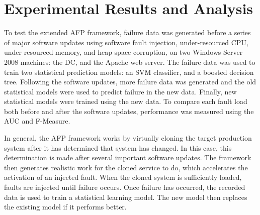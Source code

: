 % 
% 
% 
% 
\section{Experimental Results and Analysis} \label{chapter4}
To test the extended \ac{AFP} framework, failure data was generated before a
series of major software updates using software fault injection,
under-resourced \ac{CPU}, under-resourced memory, and heap space corruption, on
two Windows Server 2008 machines: the \ac{DC}, and the Apache web server.  The
failure data was used to train two statistical prediction models: an \ac{SVM}
classifier, and a boosted decision tree.  Following the software updates, more
failure data was generated and the old statistical models were used to predict
failure in the new data.  Finally, new statistical models were trained using
the new data.  To compare each fault load both before and after the software
updates, performance was measured using the \ac{AUC} and F-Measure.

In general, the \ac{AFP} framework works by virtually cloning the target
production system after it has determined that system has changed.  In this
case, this determination is made after several important software updates.  The
framework then generates realistic work for the cloned service to do, which
accelerates the activation of an injected fault.  When the cloned system is
sufficiently loaded, faults are injected until failure occurs.  Once failure
has occurred, the recorded data is used to train a statistical learning model.
The new model then replaces the existing model if it performs better.

